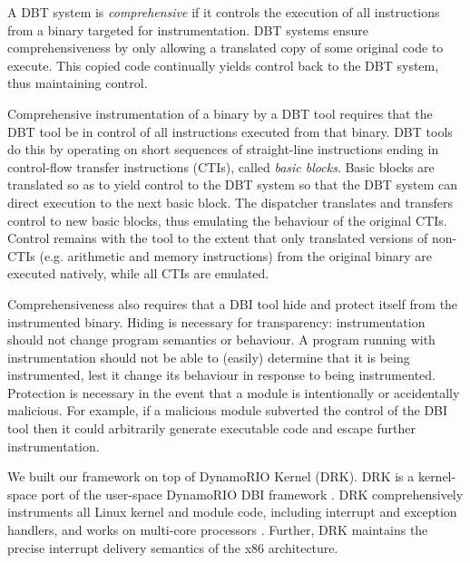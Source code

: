 \documentclass[letterpaper,twocolumn,10pt]{article}
\begin{document}
A DBT system is \emph{comprehensive} if it controls the execution of all instructions from a binary targeted for instrumentation. DBT systems ensure comprehensiveness by only allowing a translated copy of some original code to execute. This copied code continually yields control back to the DBT system, thus maintaining control.

Comprehensive instrumentation of a binary by a DBT tool requires that the DBT tool be in control of all instructions executed from that binary. DBT tools do this by operating on short sequences of straight-line instructions ending in control-flow transfer instructions (CTIs), called \emph{basic blocks}. Basic blocks are translated so as to yield control to the DBT system so that the DBT system can direct execution to the next basic block. The dispatcher translates and transfers control to new basic blocks, thus emulating the behaviour of the original CTIs. Control remains with the tool to the extent that only translated versions of non-CTIs (e.g. arithmetic and memory instructions) from the original binary are executed natively, while all CTIs are emulated.

Comprehensiveness also requires that a DBI tool hide and protect itself from the instrumented binary. Hiding is necessary for transparency: instrumentation should not change program semantics or behaviour. A program running with instrumentation should not be able to (easily) determine that it is being instrumented, lest it change its behaviour in response to being instrumented. Protection is necessary in the event that a module is intentionally or accidentally malicious. For example, if a malicious module subverted the control of the DBI tool then it could arbitrarily generate executable code and escape further instrumentation.


We built our framework on top of DynamoRIO Kernel (DRK). DRK is a kernel-space port of the user-space DynamoRIO DBI framework \cite{Bruening2004}. DRK comprehensively instruments all Linux kernel and module code, including interrupt and exception handlers, and works on multi-core processors \cite{Feiner2012}. Further, DRK maintains the precise interrupt delivery semantics of the x86 architecture.
\end{document}

